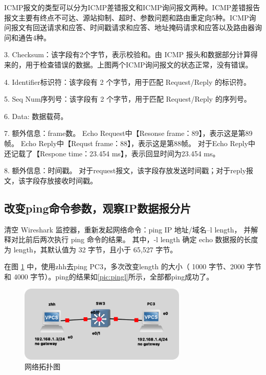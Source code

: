 \documentclass[a4paper,12pt]{report}
\begin{document}
\begin{spacing}{1.5}
ICMP报文的类型可以分为ICMP差错报文和ICMP询问报文两种。ICMP差错报告报文主要有终点不可达、源站抑制、超时、参数问题和路由重定向5种。ICMP询问报文有回送请求和应答、时间戳请求和应答、地址掩码请求和应答以及路由器询问和通告4种。

3. Checksum：该字段有2个字节，表示校验和。由 ICMP 报头和数据部分计算得来的，用于检查错误的数据。上图两个ICMP询问报文的状态正常，没有错误。

4. Identifier标识符：该字段有 2 个字节，用于匹配 Request/Reply 的标识符。

5. Seq Num序列号：该字段有 2 个字节，用于匹配 Request/Reply 的序列号。

6. Data: 数据载荷。

7. 额外信息：frame数。
Echo Request中【Resonse frame：89】，表示这是第89帧。
Echo Reply中【Requst frame：88】，表示这是第88帧。
对于Echo Reply中还记载了【Respone time：23.454 ms】，表示回显时间为23.454 ms。

8. 额外信息：时间戳。
对于request报文，该字段存放发送时间戳；对于reply报文，该字段存放接收时间戳。



\subsection{改变ping命令参数，观察IP数据报分片}
清空 Wireshark 监控器，重新发起网络命令：ping IP 地址/域名–l length，
并解释对比前后两次执行 ping 命令的结果。
其中，-l length 确定 echo 数据报的长度为 length，其默认值为 32 字节，且小于 65,527 字节。

在图 \ref{pic:pc} 中，使用zhh去ping PC3，多次改变length 的大小（ 1000 字节、2000 字节和 4000 字节）。ping的结果如\ref{pic:pingl}所示，全部都ping成功了。

\begin{figure}[htb!]
  \centering
\includegraphics[width=8cm]{figure/pctopc.png}
\caption{网络拓扑图}
\label{pic:pc}
\end{figure}


\end{spacing}
\end{document}
